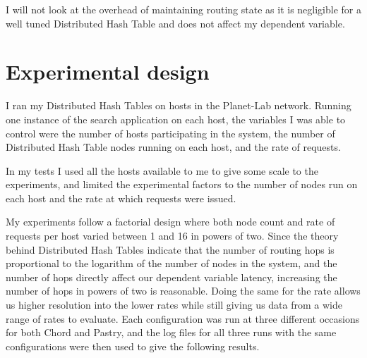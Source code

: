 I will not look at the overhead of maintaining routing state as it is negligible for a well tuned Distributed Hash Table \cite{myths} and does not affect my dependent variable.

\section{Experimental design}
I ran my Distributed Hash Tables on hosts in the Planet-Lab network. Running one instance of the search application on each host, the variables I was able to control were the number of hosts participating in the system, the number of Distributed Hash Table nodes running on each host, and the rate of requests.

In my tests I used all the hosts available to me to give some scale to the experiments, and limited the experimental factors to the number of nodes run on each host and the rate at which requests were issued.

My experiments follow a factorial design where both node count and rate of requests per host varied between 1 and 16 in powers of two. Since the theory behind Distributed Hash Tables indicate that the number of routing hops is proportional to the logarithm of the number of nodes in the system, and the number of hops directly affect our dependent variable latency, increasing the number of hops in powers of two is reasonable. Doing the same for the rate allows us higher resolution into the lower rates while still giving us data from a wide range of rates to evaluate.
Each configuration was run at three different occasions for both Chord and Pastry, and the log files for all three runs with the same configurations were then used to give the following results.

